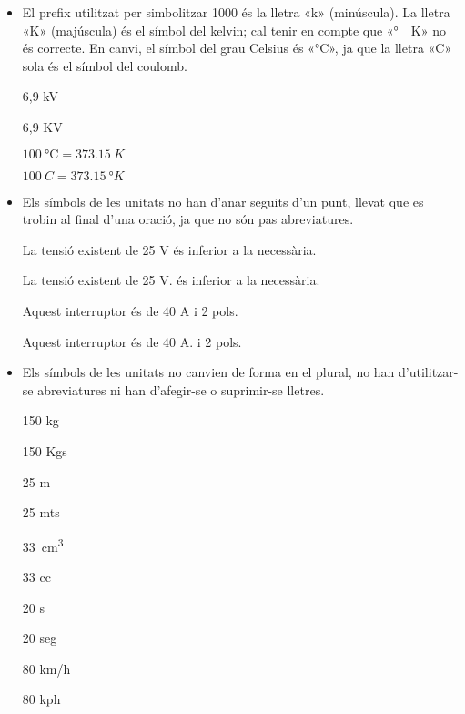 \begin{itemize}

\item El prefix utilitzat per simbolitzar 1000 és la lletra «k» (minúscula).  La lletra «K» (majúscula) és el símbol del  kelvin; cal tenir en compte que «\si{\degree{}K}»  no és correcte. En canvi, el símbol del grau Celsius és «\si{\degreeCelsius}», ja que la lletra «C» sola és el símbol del coulomb.

\textcolor{Green}\faCheckSquare{} 6,9  kV

\textcolor{Red}\faTimesCircle{} 6,9 KV

\textcolor{Green}\faCheckSquare{} $\SI{100}{\degreeCelsius} = \SI{373,15}{K}$

\textcolor{Red}\faTimesCircle{} $\SI{100}{C} = \SI{373,15}{\degree K}$

\item Els símbols de les unitats no han d'anar seguits d'un punt, llevat que es trobin al final d'una oració, ja que no són pas
abreviatures.

\textcolor{Green}\faCheckSquare{} La tensió existent de 25 V és inferior a la necessària.

\textcolor{Red}\faTimesCircle{} La tensió existent de 25 V. és inferior a la necessària.

\textcolor{Green}\faCheckSquare{}  Aquest interruptor és de 40 A i 2 pols.

\textcolor{Red}\faTimesCircle{}  Aquest interruptor és de 40 A. i 2 pols.


\item Els símbols de les unitats no canvien de forma en el plural, no han
d'utilitzar-se abreviatures ni han d'afegir-se o suprimir-se
lletres.

\textcolor{Green}\faCheckSquare{} 150 kg

\textcolor{Red}\faTimesCircle{} 150 Kgs

\textcolor{Green}\faCheckSquare{} 25 m

\textcolor{Red}\faTimesCircle{} 25 mts

\textcolor{Green}\faCheckSquare{} \SI{33}{cm^3}

\textcolor{Red}\faTimesCircle{} 33 cc

\textcolor{Green}\faCheckSquare{} 20 s

\textcolor{Red}\faTimesCircle{} 20 seg

\textcolor{Green}\faCheckSquare{} 80 km/h

\textcolor{Red}\faTimesCircle{} 80 kph


\end{itemize}
